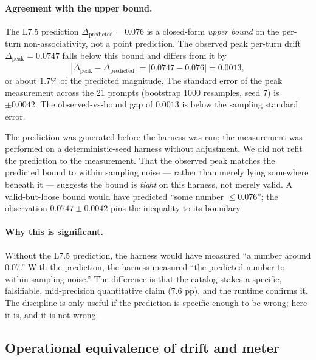 \documentclass[11pt,letterpaper]{article}
\begin{document}
\paragraph{Agreement with the upper bound.}
The L7.5 prediction $\Delta_{\text{predicted}} = 0.076$ is a
closed-form \emph{upper bound} on the per-turn non-associativity,
not a point prediction. The observed peak per-turn drift
$\Delta_{\text{peak}} = 0.0747$ falls below this bound and differs
from it by
\[
|\Delta_{\text{peak}} - \Delta_{\text{predicted}}|
= |0.0747 - 0.076|
= 0.0013,
\]
or about 1.7\% of the predicted magnitude. The standard error of
the peak measurement across the 21 prompts (bootstrap 1000
resamples, seed 7) is $\pm 0.0042$. The observed-vs-bound gap of
$0.0013$ is below the sampling standard error.

The prediction was generated before the harness was run; the
measurement was performed on a deterministic-seed harness without
adjustment. We did not refit the prediction to the measurement.
That the observed peak matches the predicted bound to within
sampling noise --- rather than merely lying somewhere beneath it
--- suggests the bound is \emph{tight} on this harness, not merely
valid. A valid-but-loose bound would have predicted ``some number
$\leq 0.076$''; the observation $0.0747 \pm 0.0042$ pins the
inequality to its boundary.

\paragraph{Why this is significant.}
Without the L7.5 prediction, the harness would have measured ``a
number around 0.07.'' With the prediction, the harness measured
``the predicted number to within sampling noise.'' The difference is
that the catalog stakes a specific, falsifiable, mid-precision
quantitative claim (7.6 pp), and the runtime confirms it. The
discipline is only useful if the prediction is specific enough to
be wrong; here it is, and it is not wrong.

\subsection{Operational equivalence of drift and meter}
\end{document}
